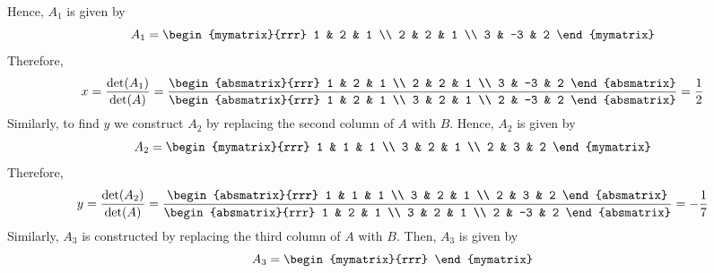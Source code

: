 \begin{solution}
  Hence, $A_1$ is given by 
  \begin{equation*}
    A_1 = 
    \begin{mymatrix}{rrr}
      1 & 2 & 1 \\
      2 & 2 & 1 \\
      3 & -3 & 2
    \end{mymatrix}
  \end{equation*}
  Therefore,
  \begin{equation*}
    x=
    \frac{\det(A_{1})}{\det(A)}
    =
    \frac{\begin{absmatrix}{rrr}
        1 &  2 & 1 \\
        2 &  2 & 1 \\
        3 & -3 & 2
      \end{absmatrix} }{\begin{absmatrix}{rrr}
        1 & 2 & 1 \\
        3 & 2 & 1 \\
        2 & -3 & 2
      \end{absmatrix} }=\frac{1}{2}
  \end{equation*}
  Similarly, to find $y$ we construct $A_2$ by replacing the second
  column of $A$ with $B$. Hence, $A_2$ is given by
  \begin{equation*}
    A_2
    =
    \begin{mymatrix}{rrr}
      1 & 1 & 1 \\
      3 & 2 & 1 \\
      2 & 3 & 2
    \end{mymatrix}
  \end{equation*}
  Therefore,
  \begin{equation*}
    y=\frac{\det(A_{2})}{\det(A)}
    = \frac{\begin{absmatrix}{rrr}
        1 & 1 & 1 \\
        3 & 2 & 1 \\
        2 & 3 & 2
      \end{absmatrix} }{\begin{absmatrix}{rrr}
        1 & 2 & 1 \\
        3 & 2 & 1 \\
        2 & -3 & 2
      \end{absmatrix} }
    = -\frac{1}{7}
  \end{equation*}
  Similarly, $A_3$ is constructed by replacing the third column of $A$
  with $B$. Then, $A_3$ is given by
  \begin{equation*}
    A_3
    =
    \begin{mymatrix}{rrr}

\end{mymatrix}
\end{equation*}
\end{solution}
